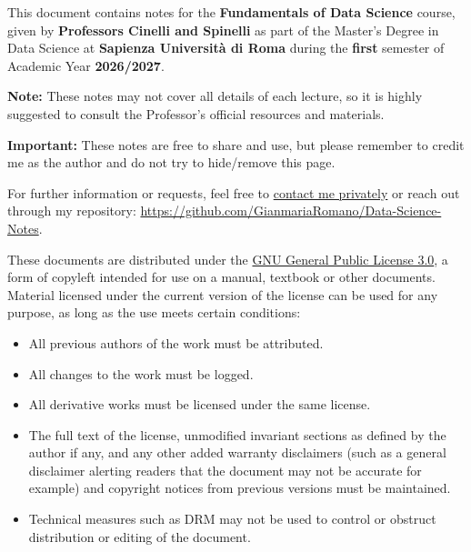 \documentclass{report}
\begin{document}
\begin{tcolorbox}[colback=gray!5!white, colframe=gray!75!black, title=Disclaimer]
    This document contains notes for the \textbf{Fundamentals of Data Science} course, given by \textbf{Professors Cinelli and Spinelli} as part of the Master’s Degree in Data Science at \textbf{Sapienza Università di Roma} during the \textbf{first} semester of Academic Year \textbf{2026/2027}.
    
    \smallskip
    \textbf{Note: }These notes may not cover all details of each lecture, so it is highly suggested to consult the Professor's official resources and materials. 
    
    \smallskip
    \textbf{Important: }These notes are free to share and use, but please remember to credit me as the author and do not try to hide/remove this page.
\end{tcolorbox}

\begin{tcolorbox}[colback=gray!5!white, colframe=gray!75!black, title=Contacts]
    For further information or requests, feel free to \href{https://t.me/toritosenso}{contact me privately} or reach out through my repository: \href{https://github.com/GianmariaRomano/Data-Science-Notes}{https://github.com/GianmariaRomano/Data-Science-Notes}.
\end{tcolorbox}

\begin{tcolorbox}[colback=gray!5!white, colframe=gray!75!black, title=License]
    These documents are distributed under the \href{https://www.gnu.org/licenses/gpl-3.0.en.html}{GNU General Public License 3.0}, a form of copyleft intended for use on a manual, textbook or other documents. Material licensed under the current version of the license can be used for any purpose, as long as the use meets certain conditions:
    \begin{itemize}
        \item All previous authors of the work must be attributed.
        \item All changes to the work must be logged.
        \item All derivative works must be licensed under the same license.
        \item The full text of the license, unmodified invariant sections as defined by the author if any, and any other added warranty disclaimers (such as a general disclaimer alerting readers that the document may not be accurate for example) and copyright notices from previous versions must be maintained.
        \item Technical measures such as DRM may not be used to control or obstruct distribution or editing of the document.
    \end{itemize}
\end{tcolorbox}
\end{document}
